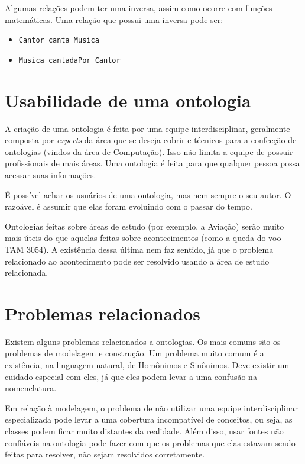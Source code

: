 Algumas relações podem ter uma inversa, assim como ocorre com funções matemáticas. Uma relação que possui uma inversa pode ser:

\begin{itemize}
	\item \texttt{Cantor canta Musica}
	\item \texttt{Musica cantadaPor Cantor}
\end{itemize}

\section{Usabilidade de uma ontologia}

A criação de uma ontologia é feita por uma equipe interdisciplinar, geralmente composta por \textit{experts} da área que se deseja cobrir e técnicos para a confecção de ontologias (vindos da área de Computação). Isso não limita a equipe de possuir profissionais de mais áreas. Uma ontologia é feita para que qualquer pessoa possa acessar suas informações.

É possível achar os usuários de uma ontologia, mas nem sempre o seu autor. O razoável é assumir que elas foram evoluindo com o passar do tempo. 

Ontologias feitas sobre áreas de estudo (por exemplo, a Aviação) serão muito mais úteis do que aquelas feitas sobre acontecimentos (como a queda do voo TAM 3054). A existência dessa última nem faz sentido, já que o problema relacionado ao acontecimento pode ser resolvido usando a área de estudo relacionada.

\section{Problemas relacionados}

	Existem alguns problemas relacionados a ontologias. Os mais comuns são os problemas de modelagem e construção. Um problema muito comum é a existência, na linguagem natural, de Homônimos e Sinônimos. Deve existir um cuidado especial com eles, já que eles podem levar a uma confusão na nomenclatura.
	
	Em relação à modelagem, o problema de não utilizar uma equipe interdisciplinar especializada pode levar a uma cobertura incompatível de conceitos, ou seja, as classes podem ficar muito distantes da realidade. Além disso, usar fontes não confiáveis na ontologia pode fazer com que os problemas que elas estavam sendo feitas para resolver, não sejam resolvidos corretamente.
	
